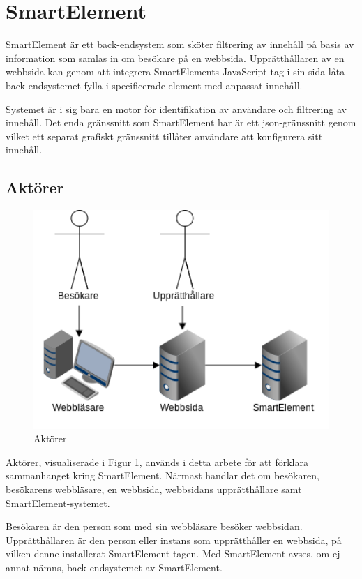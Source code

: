 \section{SmartElement}

SmartElement är ett back-endsystem som sköter filtrering av innehåll på basis av information som samlas in om besökare på en webbsida. Upprätthållaren av en webbsida kan genom att integrera SmartElements JavaScript-tag i sin sida låta back-endsystemet fylla i specificerade element med anpassat innehåll.

Systemet är i sig bara en motor för identifikation av användare och filtrering av innehåll. Det enda gränssnitt som SmartElement har är ett \gls{json}-gränssnitt genom vilket ett separat grafiskt gränssnitt tillåter användare att konfigurera sitt innehåll.

\subsection{Aktörer}

\begin{figure}[h!]
\centering
\includegraphics[width=150mm]{assets/images/smeleactors.png}
\caption{Aktörer}
\label{actors}
\end{figure}

Aktörer, visualiserade i Figur \ref{actors}, används i detta arbete för att förklara sammanhanget kring SmartElement. Närmast handlar det om besökaren, besökarens webbläsare, en webbsida, webbsidans upprätthållare samt SmartElement-systemet.

Besökaren är den person som med sin webbläsare besöker webbsidan. Upprätthållaren är den person eller instans som upprätthåller en webbsida, på vilken denne installerat SmartElement-tagen. Med SmartElement avses, om ej annat nämns, back-endsystemet av SmartElement.

